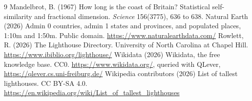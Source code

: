 \documentclass[11pt,a4paper]{article}
\begin{document}
\begin{thebibliography}{9}
 Mandelbrot, B. (1967) How long is the coast of Britain? Statistical self-similarity and fractional dimension. \emph{Science} 156(3775), 636 to 638.
 Natural Earth (2026) Admin 0 countries, admin 1 states and provinces, and populated places, 1:10m and 1:50m. Public domain. \url{https://www.naturalearthdata.com/}
 Rowlett, R. (2026) The Lighthouse Directory. University of North Carolina at Chapel Hill. \url{https://www.ibiblio.org/lighthouse/}
 Wikidata (2026) Wikidata, the free knowledge base. CC0. \url{https://www.wikidata.org/}, queried with QLever, \url{https://qlever.cs.uni-freiburg.de/}
 Wikipedia contributors (2026) List of tallest lighthouses. CC BY-SA 4.0. \url{https://en.wikipedia.org/wiki/List_of_tallest_lighthouses}
\end{thebibliography}
\end{document}
